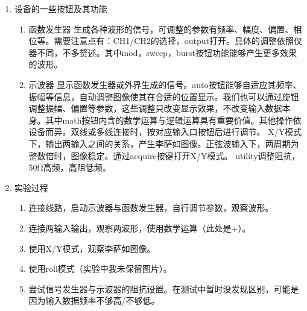 \documentclass[11pt]{article}
\begin{document}
\begin{enumerate}
    \item 设备的一些按钮及其功能
    \begin{enumerate}
        \item 函数发生器 \newline \hspace*{2em} 生成各种波形的信号，可调整的参数有频率、幅度、偏置、相位等。需要注意点有：CH1/CH2的选择，output打开。具体的调整依照仪器不同，不多赘述。其中mod，sweep，burst按钮功能能够产生更多效果的波形。
        \item 示波器 \newline \hspace*{2em} 显示函数发生器或外界生成的信号。auto按钮能够自适应其频率、振幅等信息，自动调整图像使其在合适的位置显示。我们也可以通过旋钮调整振幅、偏置等参数，这些调整只改变显示效果，不改变输入数据本身。其中math按钮内含的数学运算与逻辑运算具有重要价值。其他操作依设备而异。双线或多线连接时，按对应输入口按钮后进行调节。
              \newline \hspace*{2em} X/Y模式下，输出两输入之间的关系，产生李萨如图像。正弦波输入下，两周期为整数倍时，图像稳定。通过acquire按键打开X/Y模式。 
              \newline \hspace*{2em} utility调整阻抗，50Ω高频，高阻低频。
    \end{enumerate}
    \item 实验过程
    \begin{enumerate}
        \item 连接线路，启动示波器与函数发生器，自行调节参数，观察波形。
        \item 连接两输入输出，观察两波形，使用数学运算（此处是+）。
        \item 使用X/Y模式，观察李萨如图像。
        \item 使用roll模式（实验中我未保留图片）。
        \item 尝试信号发生器与示波器的阻抗设置。在测试中暂时没发现区别，可能是因为输入数据频率不够高/不够低。
        


\end{enumerate}
\end{enumerate}
\end{document}
